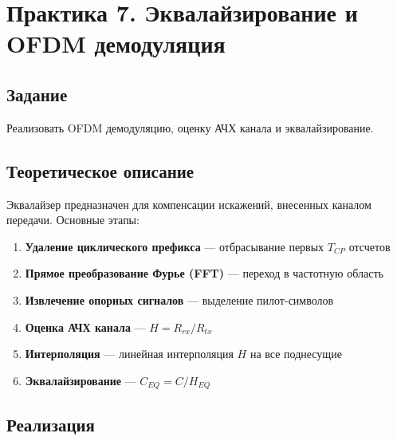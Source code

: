 \chapter{Практика 7. Эквалайзирование и OFDM демодуляция}

\section{Задание}
Реализовать OFDM демодуляцию, оценку АЧХ канала и эквалайзирование.

\section{Теоретическое описание}
Эквалайзер предназначен для компенсации искажений, внесенных каналом передачи. Основные этапы:

\begin{enumerate}
    \item \textbf{Удаление циклического префикса} — отбрасывание первых $T_{CP}$ отсчетов
    \item \textbf{Прямое преобразование Фурье (FFT)} — переход в частотную область
    \item \textbf{Извлечение опорных сигналов} — выделение пилот-символов
    \item \textbf{Оценка АЧХ канала} — $H = R_{rx} / R_{tx}$
    \item \textbf{Интерполяция} — линейная интерполяция $H$ на все поднесущие
    \item \textbf{Эквалайзирование} — $C_{EQ} = C / H_{EQ}$
\end{enumerate}

\section{Реализация}

